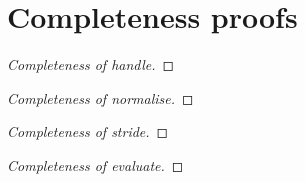 
\section{Completeness proofs}
\label{sec:completenessproofs}


\begin{proof}[Completeness of handle]

\end{proof}

\begin{proof}[Completeness of normalise]

\end{proof}

\begin{proof}[Completeness of stride]

\end{proof}

\begin{proof}[Completeness of evaluate]

\end{proof}

